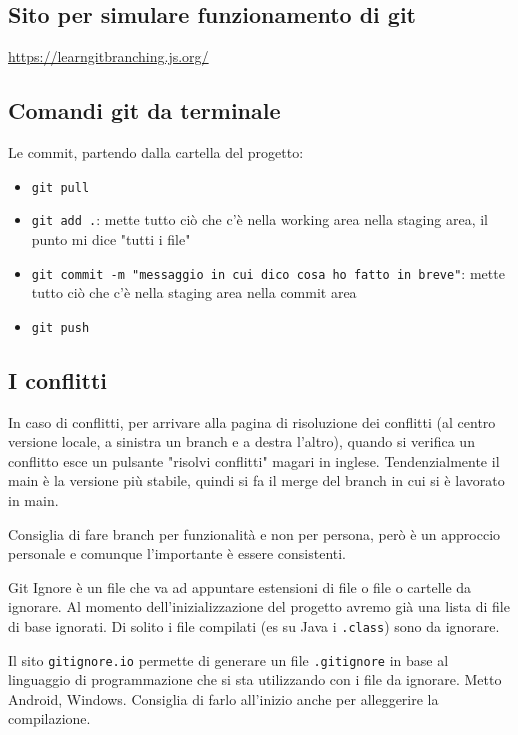 \subsection{Sito per simulare funzionamento di git}
\url{https://learngitbranching.js.org/}

\subsection{Comandi git da terminale}
\par Le commit, partendo dalla cartella del progetto:
\begin{itemize}
    \item \texttt{git pull}
    \item \texttt{git add .}: mette tutto ciò che c'è nella working area nella staging area, il punto mi dice "tutti i file"
    \item \texttt{git commit -m "messaggio in cui dico cosa ho fatto in breve"}: mette tutto ciò che c'è nella staging area nella commit area
    \item \texttt{git push}
\end{itemize}

\subsection{I conflitti}
\par In caso di conflitti, per arrivare alla pagina di risoluzione dei conflitti (al centro versione locale, a sinistra un branch e a destra l'altro), quando si verifica un conflitto esce un pulsante "risolvi conflitti" magari in inglese. Tendenzialmente il main è la versione più stabile, quindi si fa il merge del branch in cui si è lavorato in main.
\par Consiglia di fare branch per funzionalità e non per persona, però è un approccio personale e comunque l'importante è essere consistenti.


\par Git Ignore è un file che va ad appuntare estensioni di file o file o cartelle da ignorare. Al momento dell'inizializzazione del progetto avremo già una lista di file di base ignorati. Di solito i file compilati (es su Java i \texttt{.class}) sono da ignorare.
\par Il sito \texttt{gitignore.io} permette di generare un file \texttt{.gitignore} in base al linguaggio di programmazione che si sta utilizzando con i file da ignorare. Metto Android, Windows. Consiglia di farlo all'inizio anche per alleggerire la compilazione.

